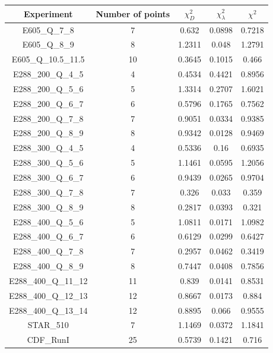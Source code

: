 \documentclass[
]{article}
\begin{document}
\begin{table}[h]

\centering

\begin{tabular}{|c|c|c|c|c|} \hline

\textbf{Experiment} & \textbf{Number of
points} & \textbf{\(\chi_{D}^2\)} & \textbf{\(\chi_{\lambda}^2\)} & \textbf{\(\chi^2\)} \\ \hline

E605\_Q\_7\_8 & 7 & 0.632 & 0.0898 & 0.7218 \\ \hline
E605\_Q\_8\_9 & 8 & 1.2311 & 0.048 & 1.2791 \\ \hline
E605\_Q\_10.5\_11.5 & 10 & 0.3645 & 0.1015 & 0.466 \\ \hline
E288\_200\_Q\_4\_5 & 4 & 0.4534 & 0.4421 & 0.8956 \\ \hline
E288\_200\_Q\_5\_6 & 5 & 1.3314 & 0.2707 & 1.6021 \\ \hline
E288\_200\_Q\_6\_7 & 6 & 0.5796 & 0.1765 & 0.7562 \\ \hline
E288\_200\_Q\_7\_8 & 7 & 0.9051 & 0.0334 & 0.9385 \\ \hline
E288\_200\_Q\_8\_9 & 8 & 0.9342 & 0.0128 & 0.9469 \\ \hline
E288\_300\_Q\_4\_5 & 4 & 0.5336 & 0.16 & 0.6935 \\ \hline
E288\_300\_Q\_5\_6 & 5 & 1.1461 & 0.0595 & 1.2056 \\ \hline
E288\_300\_Q\_6\_7 & 6 & 0.9439 & 0.0265 & 0.9704 \\ \hline
E288\_300\_Q\_7\_8 & 7 & 0.326 & 0.033 & 0.359 \\ \hline
E288\_300\_Q\_8\_9 & 8 & 0.2817 & 0.0393 & 0.321 \\ \hline
E288\_400\_Q\_5\_6 & 5 & 1.0811 & 0.0171 & 1.0982 \\ \hline
E288\_400\_Q\_6\_7 & 6 & 0.6129 & 0.0299 & 0.6427 \\ \hline
E288\_400\_Q\_7\_8 & 7 & 0.2957 & 0.0462 & 0.3419 \\ \hline
E288\_400\_Q\_8\_9 & 8 & 0.7447 & 0.0408 & 0.7856 \\ \hline
E288\_400\_Q\_11\_12 & 11 & 0.839 & 0.0141 & 0.8531 \\ \hline
E288\_400\_Q\_12\_13 & 12 & 0.8667 & 0.0173 & 0.884 \\ \hline
E288\_400\_Q\_13\_14 & 12 & 0.8895 & 0.066 & 0.9555 \\ \hline
STAR\_510 & 7 & 1.1469 & 0.0372 & 1.1841 \\ \hline
CDF\_RunI & 25 & 0.5739 & 0.1421 & 0.716 \\ \hline

\end{tabular}
\end{table}
\end{document}
